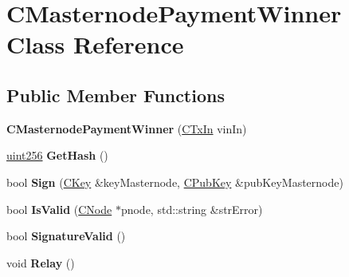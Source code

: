 \hypertarget{class_c_masternode_payment_winner}{}\section{C\+Masternode\+Payment\+Winner Class Reference}
\label{class_c_masternode_payment_winner}
\subsection*{Public Member Functions}
\begin{DoxyCompactItemize}
\item 
\mbox{\label{class_c_masternode_payment_winner_ab3a98fee3450cd4b36efdd676a536e75}} 
{\bfseries C\+Masternode\+Payment\+Winner} (\mbox{\hyperlink{class_c_tx_in}{C\+Tx\+In}} vin\+In)
\item 
\mbox{\label{class_c_masternode_payment_winner_a0580947e55d3bee159825472ca95ff67}} 
\mbox{\hyperlink{classuint256}{uint256}} {\bfseries Get\+Hash} ()
\item 
\mbox{\label{class_c_masternode_payment_winner_abeb1dae2c5d21c30ae476e37f3453fd9}} 
bool {\bfseries Sign} (\mbox{\hyperlink{class_c_key}{C\+Key}} \&key\+Masternode, \mbox{\hyperlink{class_c_pub_key}{C\+Pub\+Key}} \&pub\+Key\+Masternode)
\item 
\mbox{\label{class_c_masternode_payment_winner_aea2d96fdfccdb2b79595c68cb1ba82e7}} 
bool {\bfseries Is\+Valid} (\mbox{\hyperlink{class_c_node}{C\+Node}} $\ast$pnode, std\+::string \&str\+Error)
\item 
\mbox{\label{class_c_masternode_payment_winner_a7fa9251195562a7f0ef2d9c30748ba6c}} 
bool {\bfseries Signature\+Valid} ()
\item 
\mbox{\label{class_c_masternode_payment_winner_af35c61d7bafc3f7bada5974948d76004}} 
void {\bfseries Relay} ()
\item 
\mbox{\label{class_c_masternode_payment_winner_a287da67a9568d8d8a30251b7b02a13c3}} 

\end{DoxyCompactItemize}

